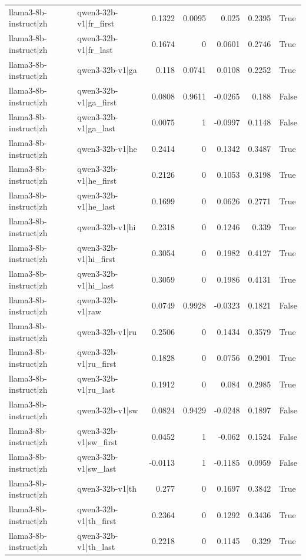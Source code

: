 \begin{table}
\begin{tabular}{l l r r r r l}
llama3-8b-instruct|zh & qwen3-32b-v1|fr_first & 0.1322 & 0.0095 & 0.025 & 0.2395 & True \\
llama3-8b-instruct|zh & qwen3-32b-v1|fr_last & 0.1674 & 0 & 0.0601 & 0.2746 & True \\
llama3-8b-instruct|zh & qwen3-32b-v1|ga & 0.118 & 0.0741 & 0.0108 & 0.2252 & True \\
llama3-8b-instruct|zh & qwen3-32b-v1|ga_first & 0.0808 & 0.9611 & -0.0265 & 0.188 & False \\
llama3-8b-instruct|zh & qwen3-32b-v1|ga_last & 0.0075 & 1 & -0.0997 & 0.1148 & False \\
llama3-8b-instruct|zh & qwen3-32b-v1|he & 0.2414 & 0 & 0.1342 & 0.3487 & True \\
llama3-8b-instruct|zh & qwen3-32b-v1|he_first & 0.2126 & 0 & 0.1053 & 0.3198 & True \\
llama3-8b-instruct|zh & qwen3-32b-v1|he_last & 0.1699 & 0 & 0.0626 & 0.2771 & True \\
llama3-8b-instruct|zh & qwen3-32b-v1|hi & 0.2318 & 0 & 0.1246 & 0.339 & True \\
llama3-8b-instruct|zh & qwen3-32b-v1|hi_first & 0.3054 & 0 & 0.1982 & 0.4127 & True \\
llama3-8b-instruct|zh & qwen3-32b-v1|hi_last & 0.3059 & 0 & 0.1986 & 0.4131 & True \\
llama3-8b-instruct|zh & qwen3-32b-v1|raw & 0.0749 & 0.9928 & -0.0323 & 0.1821 & False \\
llama3-8b-instruct|zh & qwen3-32b-v1|ru & 0.2506 & 0 & 0.1434 & 0.3579 & True \\
llama3-8b-instruct|zh & qwen3-32b-v1|ru_first & 0.1828 & 0 & 0.0756 & 0.2901 & True \\
llama3-8b-instruct|zh & qwen3-32b-v1|ru_last & 0.1912 & 0 & 0.084 & 0.2985 & True \\
llama3-8b-instruct|zh & qwen3-32b-v1|sw & 0.0824 & 0.9429 & -0.0248 & 0.1897 & False \\
llama3-8b-instruct|zh & qwen3-32b-v1|sw_first & 0.0452 & 1 & -0.062 & 0.1524 & False \\
llama3-8b-instruct|zh & qwen3-32b-v1|sw_last & -0.0113 & 1 & -0.1185 & 0.0959 & False \\
llama3-8b-instruct|zh & qwen3-32b-v1|th & 0.277 & 0 & 0.1697 & 0.3842 & True \\
llama3-8b-instruct|zh & qwen3-32b-v1|th_first & 0.2364 & 0 & 0.1292 & 0.3436 & True \\
llama3-8b-instruct|zh & qwen3-32b-v1|th_last & 0.2218 & 0 & 0.1145 & 0.329 & True \\

\end{tabular}
\end{table}
